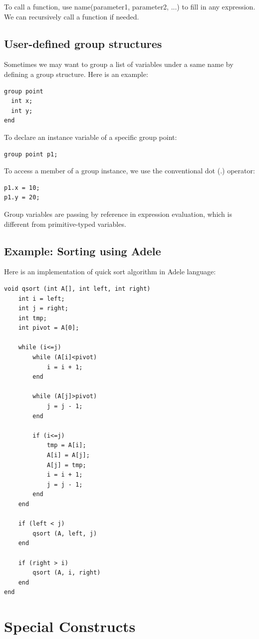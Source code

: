 \documentclass[11pt,letterpaper]{article}
\begin{document}
To call a function, use name(parameter1, parameter2, ...) to fill in any expression. We can recursively call a function if needed.

\subsection {User-defined group structures}
Sometimes we may want to group a list of variables under a same name by defining a group structure. Here is an example:

\begin{lstlisting}
group point
  int x;
  int y;
end
\end{lstlisting}

To declare an instance variable of a specific group point:
\begin{lstlisting}
group point p1;
\end{lstlisting}

To access a member of a group instance, we use the conventional dot (.) operator:
\begin{lstlisting}
p1.x = 10;
p1.y = 20;
\end{lstlisting}

Group variables are passing by reference in expression evaluation, which is different from primitive-typed variables.

\subsection {Example: Sorting using Adele}

Here is an implementation of quick sort algorithm in Adele language:

\begin{lstlisting}[caption=qsort.adl, label=qsort, captionpos=b]
void qsort (int A[], int left, int right)
	int i = left;
	int j = right;
	int tmp;
	int pivot = A[0];

	while (i<=j)
		while (A[i]<pivot)
			i = i + 1;
		end
  		
		while (A[j]>pivot)
			j = j - 1;
		end
  		
  		if (i<=j)
			tmp = A[i];
			A[i] = A[j];
			A[j] = tmp;
			i = i + 1;
			j = j - 1;
		end
	end

	if (left < j)
  		qsort (A, left, j)
	end

	if (right > i)
  		qsort (A, i, right)
	end
end
\end{lstlisting}


\section {Special Constructs}
\end{document}
